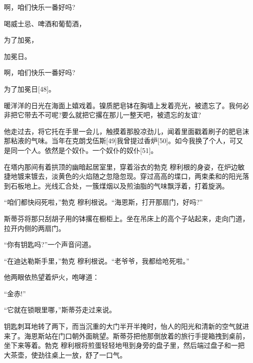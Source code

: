 \documentclass{article}
\begin{document}
啊，咱们快乐一番好吗?



喝威士忌、啤酒和葡萄酒，



为了加冕，



加冕日。



啊，咱们快乐一番好吗?



为了加冕日[48]。



暖洋洋的日光在海面上嬉戏着。镍质肥皂钵在胸墙上发着亮光，被遗忘了。我何必非把它带去不可呢?要么就把它撂在那儿一整天吧，被遗忘的友谊?



他走过去，将它托在手里一会儿，触摸着那股凉劲儿，闻着里面戳着刷子的肥皂沫那粘液的气味。当年在克朗戈伍斯[49]我曾提过香炉[50]。如今我换了个人，可又是同一个人。依然是个奴仆。一个奴仆的奴仆[51]。



在塔内那间有着拱顶的幽暗起居室里，穿着浴衣的勃克 \cdot 穆利根的身姿，在炉边敏捷地镀来镀去，淡黄色的火焰随之忽隐忽现。穿过高高的堞口，两束柔和的阳光落到石板地上。光线汇合处，一簇煤烟以及煎油脂的气味飘浮着，打着旋涡。



“咱们都快闷死啦，”勃克 \cdot 穆利根说。“海恩斯，打开那扇门，好吗?”



斯蒂芬将那只刮胡子用的钵撂在橱柜上。坐在吊床上的高个子站起来，走向门道，拉开内侧的两扇门。



“你有钥匙吗?”一个声音问道。



“在迪达勒斯手里，”勃克 \cdot 穆利根说。“老爷爷，我都给呛死啦。”



他两眼依热望着炉火，咆哮道：



“金赤!”



“它就在锁眼里哪，”斯蒂芬走过来说。



钥匙刺耳地转了两下，而当沉重的大门半开半掩时，怡人的阳光和清新的空气就进来了。海恩斯站在门口朝外面眺望。斯蒂芬把他那倒放着的旅行手提箱拽到桌前，坐下来等着。勃克 \cdot 穆利根将煎蛋轻轻地甩到身旁的盘子里，然后端过盘子和一把大茶壶，使劲往桌上一放，舒了一口气。
\end{document}
